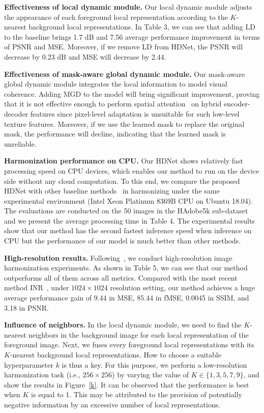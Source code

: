 \documentclass[sigconf]{acmart}
\begin{document}
\noindent
\textbf{Effectiveness of local dynamic module.} Our local dynamic module adjusts the appearance of each foreground local representation according to the $K$-nearest background local representations. In Table 3, we can see that adding LD to the baseline brings 1.7 dB and 7.56 average performance improvement in terms of PSNR and MSE. Moreover, if we remove LD from HDNet, the PSNR will decrease by 0.23 dB and MSE will decrease by 2.44.


\noindent
\textbf{Effectiveness of mask-aware global dynamic module.} Our mask-aware global dynamic module integrates the local information to model visual coherence. Adding MGD to the model will bring significant improvement, proving that it is not effective enough to perform spatial attention~\cite{RAIN,hang2022scs} on hybrid encoder-decoder features since pixel-level adaptation is unsuitable for such low-level texture features. Moreover, if we use the learned mask to replace the original mask, the performance will decline, indicating that the learned mask is unreliable.


\noindent
\textbf{Harmonization performance on CPU.} Our HDNet shows relatively fast processing speed on CPU devices, which enables our method to run on the device side without any cloud computation. To this end, we compare the proposed HDNet with other baseline methods~\cite{SSAM,DoveNet,Bargainnet,IHT,liang2021spatial} in harmonizing under the same experimental environment (Intel Xeon Platinum 8369B CPU on Ubuntu 18.04). The evaluations are conducted on the 50 images in the HAdobe5k sub-dataset and we present the average processing time in Table 4. The experimental results show that our method has the second fastest inference speed when inference on CPU but the performance of our model is much better than other methods.

\noindent
\textbf{High-resolution results.}
Following~\cite{CDTNet}, we conduct high-resolution image harmonization experiments. As shown in Table 5, we can see that our method outperforms all of them across all metrics. Compared with the most recent method INR~\cite{inr}, under $1024\times1024$ resolution setting, our method achieves a huge average performance gain of 9.44 in MSE, 85.44 in fMSE, 0.0045 in SSIM, and 3.18 in PSNR. 


\noindent
\textbf{Influence of neighbors.} In the local dynamic module, we need to find the $K$-nearest neighbors in the background image for each local representation of the foreground image. Next, we fuses every foreground local representations with its $K$-nearest background local representations. How to choose a suitable hyperparameter $k$ is thus a key. For this purpose, we perform a low-resolution harmonization task (i.e., $256\times 256$) by varying the value of $K \in \{1, 3, 5, 7, 9\}$, and show the results in Figure~\ref{k}. It can be observed that the performance is best when $K$ is equal to 1. This may be attributed to the provision of potentially negative information by an excessive number of local representations.
\end{document}
